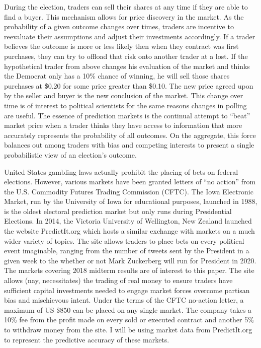 \documentclass[]{article}
\begin{document}
During the election, traders can sell their shares at any time if they
are able to find a buyer. This mechanism allows for price discovery in
the market. As the probability of a given outcome changes over times,
traders are incentive to reevaluate their assumptions and adjust their
investments accordingly. If a trader believes the outcome is more or
less likely then when they contract was first purchases, they can try to
offload that risk onto another trader at a lost. If the hypothetical
trader from above changes his evaluation of the market and thinks the
Democrat only has a 10\% chance of winning, he will sell those shares
purchases at \$0.20 for some price greater than \$0.10. The new price
agreed upon by the seller and buyer is the new conclusion of the market.
This change over time is of interest to political scientists for the
same reasons changes in polling are useful. The essence of prediction
markets is the continual attempt to ``beat'' market price when a trader
thinks they have access to information that more accurately represents
the probability of all outcomes. On the aggregate, this force balances
out among traders with bias and competing interests to present a single
probabilistic view of an election's outcome.

United States gambling laws actually prohibit the placing of bets on
federal elections. However, various markets have been granted letters of
``no action'' from the U.S. Commodity Futures Trading Commission (CFTC).
The Iowa Electronic Market, run by the University of Iowa for
educational purposes, launched in 1988, is the oldest electoral
prediction market but only runs during Presidential Elections. In 2014,
the Victoria University of Wellington, New Zealand launched the website
PredictIt.org which hosts a similar exchange with markets on a much
wider variety of topics. The site allows traders to place bets on every
political event imaginable, ranging from the number of tweets sent by
the President in a given week to the whether or not Mark Zuckerberg will
run for President in 2020. The markets covering 2018 midterm results are
of interest to this paper. The site allows (nay, necessitates) the
trading of real money to ensure traders have sufficient capital
investments needed to engage market forces overcome partisan bias and
mischievous intent. Under the terms of the CFTC no-action letter, a
maximum of US \$850 can be placed on any single market. The company
takes a 10\% fee from the profit made on every sold or executed contract
and another 5\% to withdraw money from the site. I will be using market
data from PredictIt.org to represent the predictive accuracy of these
markets.
\end{document}
